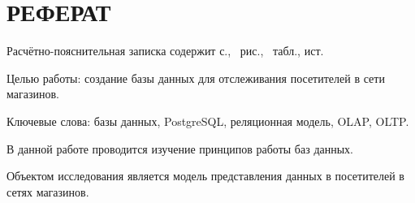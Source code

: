 \section*{РЕФЕРАТ}

Расчётно-пояснительная записка содержит \pageref{LastPage} с., \totalfigures\ рис., \totaltables\ табл.,  ист.

Целью работы: создание базы данных для отслеживания посетителей в сети магазинов.

Ключевые слова: базы данных, PostgreSQL, реляционная модель, OLAP, OLTP.

В данной работе проводится изучение принципов работы баз данных.

Объектом исследования является модель представления данных в посетителей в сетях магазинов.

\pagebreak